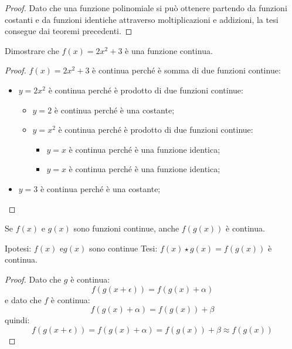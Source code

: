 \begin{proof}
Dato che una funzione polinomiale si può ottenere partendo da funzioni 
costanti e da funzioni identiche attraverso moltiplicazioni e addizioni, 
la tesi consegue dai teoremi precedenti. 
\end{proof}

\begin{esempio}
 Dimostrare che \(f(x)=2x^2 + 3\) è una funzione continua.

\begin{proof}

\(f(x)=2x^2 + 3\) è continua perché è somma di due funzioni continue: 
 \begin{itemize}[nosep]
  \item \(y=2x^2\) è continua perché è prodotto di due funzioni continue:
  \begin{itemize}[nosep]
   \item \(y=2\) è continua perché è una costante;
   \item \(y=x^2\) è continua perché è prodotto di due funzioni continue:
   \begin{itemize}[nosep]
    \item \(y=x\) è continua perché è una funzione identica;
    \item \(y=x\) è continua perché è una funzione identica;
   \end{itemize}
  \end{itemize}
  \item \(y=3\) è continua perché è una costante;
 \end{itemize}
\end{proof}

\end{esempio}

\begin{teorema}
Se \(f(x)\) e \(g(x)\) sono funzioni continue, anche \(f(g(x))\) è continua.
\end{teorema}

\noindent Ipotesi: 
\(f(x) \text{ e} g(x)\) sono continue
\tab Tesi: 
\(f(x) \star g(x) = f(g(x))\) è continua.

\begin{proof}
Dato che \(g\) è continua: 
\[f(g(x+\epsilon)) = f(g(x)+\alpha)\]
e dato che \(f\) è continua: 
\[f(g(x)+\alpha)=f(g(x))+\beta\]
quindi: 
\[f(g(x+\epsilon)) = f(g(x)+\alpha) = f(g(x))+\beta \approx f(g(x))\]
\end{proof}

